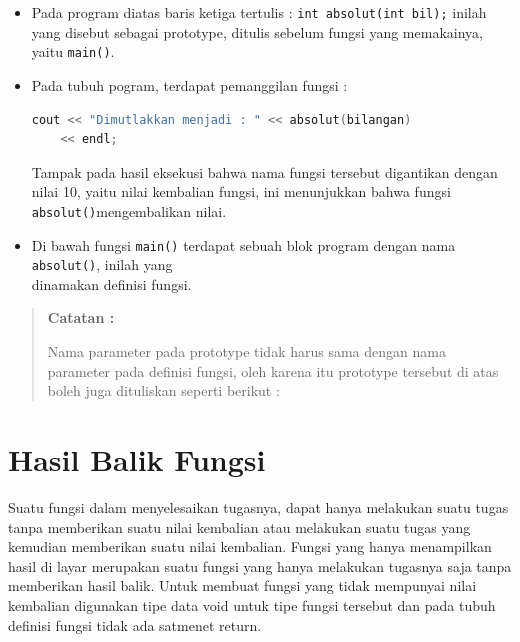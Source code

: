 \begin{itemize}

\item
 Pada program diatas baris ketiga tertulis :
 \texttt{int\ absolut(int\ bil);} inilah yang disebut sebagai
 prototype, ditulis sebelum fungsi yang memakainya, yaitu
 \texttt{main()}.\\
\item
 Pada tubuh pogram, terdapat pemanggilan fungsi :


\begin{lstlisting}[language=c++, numbers=none]
	cout << "Dimutlakkan menjadi : " << absolut(bilangan)
	<< endl;
\end{lstlisting}

Tampak pada hasil eksekusi bahwa nama fungsi tersebut digantikan dengan
nilai 10, yaitu nilai kembalian fungsi, ini menunjukkan bahwa fungsi
\texttt{absolut()}mengembalikan nilai.


\item
 Di bawah fungsi \texttt{main()} terdapat sebuah blok program dengan
 nama \texttt{absolut()}, inilah yang\\
 dinamakan definisi fungsi.

\end{itemize}
\begin{quotation}
 {\LARGE {}} \textbf{Catatan :}

 Nama parameter pada prototype tidak
 harus sama dengan nama parameter pada definisi fungsi, oleh karena itu
 prototype tersebut di atas boleh juga dituliskan seperti berikut :




\end{quotation}


\section{Hasil Balik Fungsi}\label{hasil-balik-fungsi}

Suatu fungsi dalam menyelesaikan tugasnya, dapat hanya melakukan suatu
tugas tanpa memberikan suatu nilai kembalian atau melakukan suatu tugas
yang kemudian memberikan suatu nilai kembalian. Fungsi yang hanya
menampilkan hasil di layar merupakan suatu fungsi yang hanya melakukan
tugasnya saja tanpa memberikan hasil balik. Untuk membuat fungsi yang
tidak mempunyai nilai kembalian digunakan tipe data void untuk tipe
fungsi tersebut dan pada tubuh definisi fungsi tidak ada satmenet
return.

